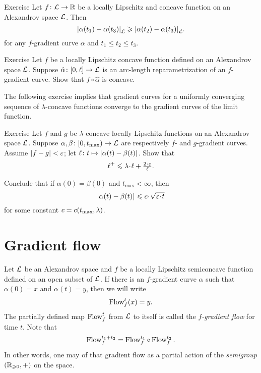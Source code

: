 \begin{thm}{Exercise}\label{ex:elf-contracting}
Let $f\colon\mathcal{L}\to\mathbb{R}$ be a locally Lipschitz and concave function on an Alexandrov space
$\mathcal{L}$.
Then 
\[|{\alpha(t_1)}-{\alpha(t_3)}|_{\mathcal{L}}^{{}}\geqslant |{\alpha(t_2)}-{\alpha(t_3)}|_{\mathcal{L}}^{{}}.\]
for any $f$-gradient curve $\alpha$ and $t_1\le t_2\le t_3$.
\end{thm}

\begin{thm}{Exercise}\label{ex:mayer}
Let $f$ be a locally Lipschitz concave function defined on an Alexandrov space $\mathcal{L}$.
Suppose $\hat\alpha\colon[0,\ell]\to\mathcal{L}$ is an arc-length reparametrization of an $f$-gradient curve.
Show that $f\circ\hat\alpha$ is concave.
\end{thm}




The following exercise implies that gradient curves for a uniformly converging sequence of $\lambda$-concave functions converge to the gradient curves of the limit function.

\begin{thm}{Exercise}\label{lem:fg-dist-est}
Let $f$ and $g$ be $\lambda$-concave locally Lipschitz functions on an Alexandrov space $\mathcal{L}$.
Suppose
$\alpha,\beta\colon[0,t_{\max})\to \mathcal{L}$ are respectively $f$- and $g$-gradient curves.
Assume $|f-g|<\varepsilon$; let $\ell\colon t\mapsto|{\alpha(t)}-{\beta(t)}|_{}^{{}}$.
Show that
\[\ell^+\le \lambda\cdot\ell+\tfrac{2\cdot\eps}{\ell}.\]

Conclude that if $\alpha(0)=\beta(0)$ and $t_{\max}<\infty$, then
\[\dist{\alpha(t)}{\beta(t)}{}
\le
\Const\cdot\sqrt{\eps\cdot t}\]
for some constant $c=c(t_{\max},\lambda)$.
\end{thm}

\section{Gradient flow}

Let $\mathcal{L}$ be an Alexandrov space 
and $f$ be a locally Lipschitz semiconcave function defined on an open subset of $\mathcal{L}$.
If there is an $f$-gradient curve $\alpha$ such that $\alpha(0)=x$ and $\alpha(t)=y$,
then we will write 
\[\mathop{\rm Flow}\nolimits^t_f(x)=y.\]
The partially defined map $\mathop{\rm Flow}\nolimits^t_f$ from $\mathcal{L}$ to itself is called the \emph{$f$-gradient flow} for time $t$.
Note that
\[\mathop{\rm Flow}\nolimits^{t_1+t_2}_f=\mathop{\rm Flow}\nolimits_f^{t_1}\circ\mathop{\rm Flow}\nolimits_f^{t_2}.\]
In other words, one may of that gradient flow as a partial action of the \textit{semigroup} $(\mathbb{R}_{\geqslant0},+)$ on the space.
 
